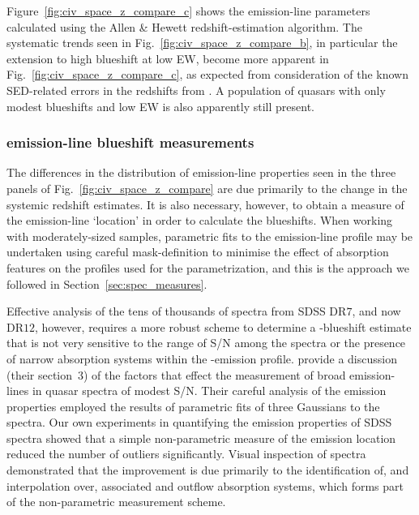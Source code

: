 Figure~\ref{fig:civ_space_z_compare_c} shows the  emission-line parameters calculated using the Allen \& Hewett redshift-estimation algorithm.  
The systematic trends seen in Fig.~\ref{fig:civ_space_z_compare_b}, in particular the extension to high blueshift at low  EW, become more apparent in Fig.~\ref{fig:civ_space_z_compare_c}, as expected from consideration of the known SED-related errors in the redshifts from \citet{hewett10}.
A population of quasars with only modest blueshifts and low EW is also apparently still present. 

\subsubsection{ emission-line blueshift measurements}
\label{sec:civmeasure}

The differences in the distribution of  emission-line properties seen in the three panels of Fig.~\ref{fig:civ_space_z_compare} are due primarily to the change in the systemic redshift estimates. 
It is also necessary, however, to obtain a measure of the  emission-line `location' in order to calculate the blueshifts. 
When working with moderately-sized samples, parametric fits to the emission-line profile may be undertaken using careful mask-definition to minimise the effect of absorption features on the profiles used for the parametrization, and this is the approach we followed in Section~\ref{sec:spec_measures}.

Effective analysis of the tens of thousands of spectra from SDSS DR$7$, and now DR$12$, however, requires a more robust scheme to determine a -blueshift estimate that is not very sensitive to the range of S/N among the spectra or the presence of narrow absorption systems within the -emission profile. 
\citet{shen11} provide a discussion (their section~$3$) of the factors that effect the measurement of broad emission-lines in quasar spectra of modest S/N. 
Their careful analysis of the  emission properties employed the results of parametric fits of three Gaussians to the spectra. 
Our own experiments in quantifying the  emission properties of SDSS spectra showed that a simple non-parametric measure of the  emission location reduced the number of outliers significantly. 
Visual inspection of spectra demonstrated that the improvement is due primarily to the identification of, and interpolation over, associated and outflow absorption systems, which forms part of the non-parametric measurement scheme. 

